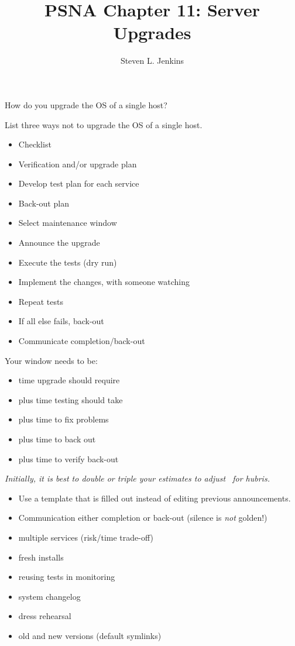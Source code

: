 \documentclass{slides}
\title{PSNA Chapter 11: Server Upgrades}
\author{Steven L. Jenkins}
\newcommand{\bi}{\begin{itemize}}
\newcommand{\ei}{\end{itemize}}
\begin{document}
How do you upgrade the OS of a single host?

List three ways not to upgrade the OS of a single host.

\bi
\item Checklist
\item Verification and/or upgrade plan 
\item Develop test plan for each service
\item Back-out plan
\item Select maintenance window
\item Announce the upgrade
\item Execute the tests (dry run)
\ei

\bi
\item Implement the changes, with someone watching
\item Repeat tests
\item If all else fails, back-out
\item Communicate completion/back-out
\ei


Your window needs to be:
\bi
\item time upgrade should require
\item plus time testing should take
\item plus time to fix problems
\item plus time to back out
\item plus time to verify back-out
\ei

\emph{Initially, it is best to double or triple your estimates to adjust \
for hubris.}


\bi
\item Use a template that is filled out instead of editing previous 
  announcements.
\item Communication either completion or back-out (silence is \emph{not}
  golden!)
\ei


\bi
\item multiple services (risk/time trade-off)
\item fresh installs
\item reusing tests in monitoring
\item system changelog
\item dress rehearsal
\item old and new versions (default symlinks)
\ei
\end{document}
